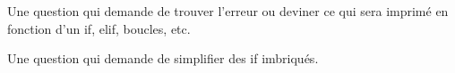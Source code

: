 
\begin{question}
    Une question qui demande de trouver l'erreur ou deviner ce qui sera
    imprimé en fonction d'un if, elif, boucles, etc.
\end{question}

\begin{question}
    Une question qui demande de simplifier des if imbriqués.
\end{question}

